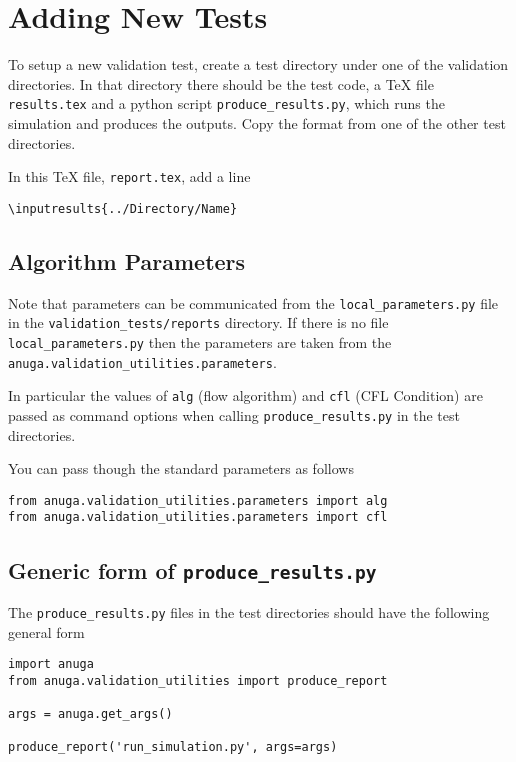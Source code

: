 \documentclass[11pt,a4paper]{report}
\begin{document}


\appendix
\chapter{Adding New Tests}


To setup a new validation test, create a test directory under one of 
the validation directories. In that directory there should be the test code, a
\TeX{} file \texttt{results.tex} and a python script
\texttt{produce\_results.py}, which runs the simulation and produces the
outputs. Copy the format from one of the other test directories. 

In this \TeX{} file, \texttt{report.tex}, add a line
\begin{verbatim}
\inputresults{../Directory/Name}
\end{verbatim}



\section{Algorithm Parameters}
Note that parameters can be communicated from the \verb|local_parameters.py|
file in the \verb|validation_tests/reports| directory. If there is no file
\verb|local_parameters.py| then the parameters are taken from the
\verb|anuga.validation_utilities.parameters|. 

In particular the
values of \verb|alg| (flow algorithm) and \verb|cfl| (CFL Condition)
are passed as command options when calling \verb|produce_results.py| in the
test directories.

You can pass though the standard parameters as follows
\begin{verbatim}
from anuga.validation_utilities.parameters import alg
from anuga.validation_utilities.parameters import cfl
\end{verbatim}

\section{Generic form of \texttt{produce\_results.py}}

The \texttt{produce\_results.py} files in the test directories should have the
following general form

\begin{verbatim}
import anuga
from anuga.validation_utilities import produce_report

args = anuga.get_args()

produce_report('run_simulation.py', args=args)
\end{verbatim}





\end{document}
